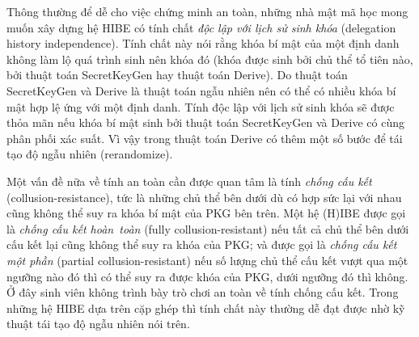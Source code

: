 \documentclass[class=report, crop=false]{standalone}
\begin{document}
			Thông thường để dễ cho việc chứng minh an toàn, những nhà mật mã học mong muốn xây dựng hệ HIBE có tính chất \textit{độc lập với lịch sử sinh khóa} (delegation history independence). Tính chất này nói rằng khóa bí mật của một định danh không làm lộ quá trình sinh nên khóa đó (khóa được sinh bởi chủ thể tổ tiên nào, bởi thuật toán \textsf{SecretKeyGen} hay thuật toán \textsf{Derive}). Do thuật toán \textsf{SecretKeyGen} và \textsf{Derive} là thuật toán ngẫu nhiên nên có thể có nhiều khóa bí mật hợp lệ ứng với một định danh. Tính độc lập với lịch sử sinh khóa sẽ được thỏa mãn nếu khóa bí mật sinh bởi thuật toán \textsf{SecretKeyGen} và \textsf{Derive} có cùng phân phối xác suất. Vì vậy trong thuật toán \textsf{Derive} có thêm một số bước để tái tạo độ ngẫu nhiên (rerandomize).
			
			Một vấn đề nữa về tính an toàn cần được quan tâm là tính \textit{chống cấu kết} (collusion-resistance), tức là những chủ thể bên dưới dù có hợp sức lại với nhau cũng không thể suy ra khóa bí mật của PKG bên trên. Một hệ (H)IBE được gọi là \textit{chống cấu kết hoàn~toàn} (fully collusion-resistant) nếu tất cả chủ thể bên dưới cấu kết lại cũng không thể suy ra khóa của PKG; và được gọi là \textit{chống cấu kết một phần} (partial collusion-resistant) nếu số lượng chủ thể cấu kết vượt qua một ngưỡng nào đó thì có thể suy ra được khóa của PKG, dưới ngưỡng đó thì không. Ở đây sinh viên không trình bày trò chơi an toàn về tính chống cấu kết. Trong những hệ HIBE dựa trên cặp ghép thì tính chất này thường dễ đạt được nhờ kỹ thuật tái tạo độ ngẫu nhiên nói trên.
\end{document}
